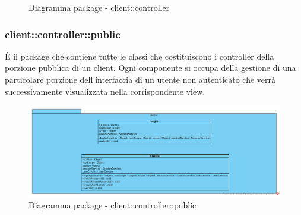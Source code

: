 \begin{center}
\begin{figure}[H]
			\caption{Diagramma package - client::controller}
		\end{figure}
	\end{center}\subsubsection{client::controller::public}
È il package che contiene tutte le classi che costituiscono i controller della porzione pubblica di un client. Ogni componente si occupa della gestione di una particolare porzione dell'interfaccia di un utente non autenticato che verrà successivamente visualizzata nella corrispondente view.\begin{center}
		\begin{figure}[H]
			\centering \includegraphics[scale=4, max width=\textwidth, max height=\myheight]{../img/diagrammiClassi/client/controller/public.png}
			\caption{Diagramma package - client::controller::public}
		\end{figure}
	\end{center}\hypertarget{client::controller::public::LogIn}{}
